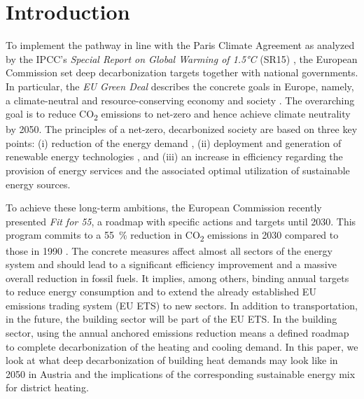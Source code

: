\section{Introduction}
To implement the pathway in line with the Paris Climate Agreement \cite{agreement2015paris} as analyzed by the IPCC's \emph{Special Report on Global Warming of 1.5°C} (SR15) \cite{book}, the European Commission set deep decarbonization targets together with national governments. In particular, the \textit{EU Green Deal} describes the concrete goals in Europe, namely, a climate-neutral and resource-conserving economy and society \cite{kemfert2019green}. The overarching goal is to reduce CO\textsubscript{2} emissions to net-zero and hence achieve climate neutrality by 2050. The principles of a net-zero, decarbonized society are based on three key points: (i) reduction of the energy demand \cite{grubler2018low}, (ii) deployment and generation of renewable energy technologies \cite{bakhtavar2020assessment}, and (iii) an increase in efficiency regarding the provision of energy services and the associated optimal utilization of sustainable energy sources.\vspace{0.5cm}

To achieve these long-term ambitions, the European Commission recently presented \textit{Fit for 55}, a roadmap with specific actions and targets until 2030. This program commits to a \SI{55}{\%} reduction in CO\textsubscript{2} emissions in 2030 compared to those in 1990 \cite{european_commission_european_2019}. The concrete measures affect almost all sectors of the energy system and should lead to a significant efficiency improvement and a massive overall reduction in fossil fuels. It implies, among others, binding annual targets to reduce energy consumption and to extend the already established EU emissions trading system (EU ETS) to new sectors. In addition to transportation, in the future, the building sector will be part of the EU ETS. In the building sector, using the annual anchored emissions reduction means a defined roadmap to complete decarbonization of the heating and cooling demand. In this paper, we look at what deep decarbonization of building heat demands may look like in 2050 in Austria and the implications of the corresponding sustainable energy mix for district heating.


